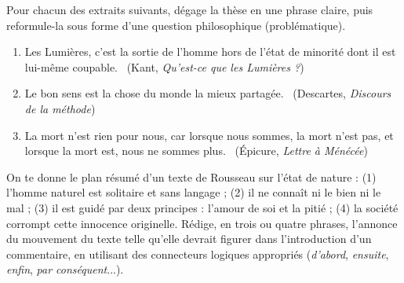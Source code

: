 \documentclass[11pt]{article}
\newcommand{\cle}[1]{{\popxbold\color{popdark}#1}}
\begin{document}
\begin{exercice}
Pour chacun des extraits suivants, dégage la thèse en une phrase claire, puis reformule-la sous forme d'une question philosophique (problématique).
\begin{enumerate}
\item \guillemotleft Les Lumières, c'est la sortie de l'homme hors de l'état de minorité dont il est lui-même coupable. \guillemotright\ (Kant, \emph{Qu'est-ce que les Lumières ?})
\item \guillemotleft Le bon sens est la chose du monde la mieux partagée. \guillemotright\ (Descartes, \emph{Discours de la méthode})
\item \guillemotleft La mort n'est rien pour nous, car lorsque nous sommes, la mort n'est pas, et lorsque la mort est, nous ne sommes plus. \guillemotright\ (Épicure, \emph{Lettre à Ménécée})
\end{enumerate}
\end{exercice}

\begin{exercice}
On te donne le plan résumé d'un texte de Rousseau sur l'état de nature : (1) l'homme naturel est solitaire et sans langage ; (2) il ne connaît ni le bien ni le mal ; (3) il est guidé par deux principes : l'amour de soi et la pitié ; (4) la société corrompt cette innocence originelle. Rédige, en trois ou quatre phrases, l'annonce du \cle{mouvement du texte} telle qu'elle devrait figurer dans l'introduction d'un commentaire, en utilisant des connecteurs logiques appropriés (\emph{d'abord}, \emph{ensuite}, \emph{enfin}, \emph{par conséquent}...).
\end{exercice}
\end{document}
